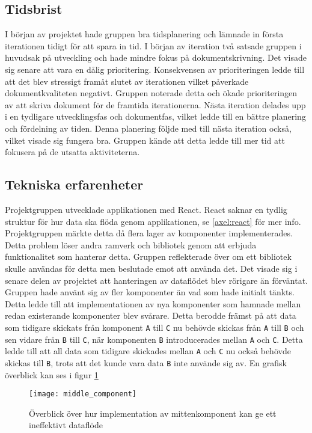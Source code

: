 \subsection{Tidsbrist}
I början av projektet hade gruppen bra tidsplanering och lämnade in första iterationen tidigt för att spara in tid. I början av iteration två satsade gruppen i huvudsak på utveckling och hade mindre fokus på dokumentskrivning. Det visade sig senare att vara en dålig prioritering. Konsekvensen av prioriteringen ledde till att det blev stressigt framåt slutet av iterationen vilket påverkade dokumentkvaliteten negativt. Gruppen noterade detta och ökade prioriteringen av att skriva dokument för de framtida iterationerna. Nästa iteration delades upp i en tydligare utvecklingsfas och dokumentfas, vilket ledde till en bättre planering och fördelning av tiden. Denna planering följde med till nästa iteration också, vilket visade sig fungera bra. Gruppen kände att detta ledde till mer tid att fokusera på de utsatta aktiviteterna.

\subsection{Tekniska erfarenheter}
Projektgruppen utvecklade applikationen med React. React saknar en tydlig struktur för hur data ska flöda genom applikationen, se \ref{axel:react} för mer info. Projektgruppen märkte detta då flera lager av komponenter implementerades. Detta problem löser andra ramverk och bibliotek genom att erbjuda funktionalitet som hanterar detta. Gruppen reflekterade över om ett bibliotek skulle användas för detta men beslutade emot att använda det. Det visade sig i senare delen av projektet att hanteringen av dataflödet blev rörigare än förväntat. Gruppen hade använt sig av fler komponenter än vad som hade initialt tänkts. Detta ledde till att implementationen av nya komponenter som hamnade mellan redan existerande komponenter blev svårare. Detta berodde främst på att data som tidigare skickats från komponent \texttt{A} till \texttt{C} nu behövde skickas från \texttt{A} till \texttt{B} och sen vidare från \texttt{B} till \texttt{C}, när komponenten \texttt{B} introducerades mellan \texttt{A} och \texttt{C}. Detta ledde till att all data som tidigare skickades mellan \texttt{A} och \texttt{C} nu också behövde skickas till \texttt{B}, trots att det kunde vara data \texttt{B} inte använde sig av. En grafisk överblick kan ses i figur \ref{fig:middle_component}

\begin{figure}[H]
    \centering
    \texttt{[image: middle\_component]}
    \caption{Överblick över hur implementation av mittenkomponent kan ge ett ineffektivt dataflöde}
    \label{fig:middle_component}
\end{figure}

